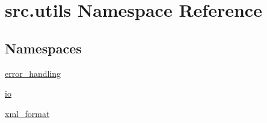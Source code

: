 \hypertarget{namespacesrc_1_1utils}{\section{src.\+utils Namespace Reference}
\label{namespacesrc_1_1utils}
}
\subsection*{Namespaces}
\begin{DoxyCompactItemize}
\item 
 \hyperlink{namespacesrc_1_1utils_1_1error__handling}{error\+\_\+handling}
\item 
 \hyperlink{namespacesrc_1_1utils_1_1io}{io}
\item 
 \hyperlink{namespacesrc_1_1utils_1_1xml__format}{xml\+\_\+format}
\end{DoxyCompactItemize}
